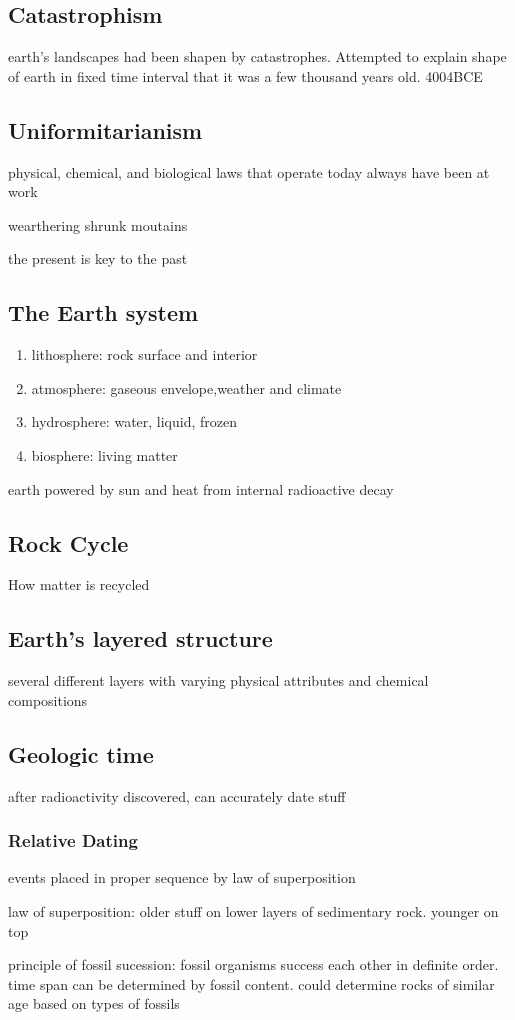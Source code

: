 \documentclass[11pt]{amsart}
\begin{document}
\subsection{Catastrophism}
\par earth's landscapes had been shapen by catastrophes. Attempted to explain
shape of earth in fixed time interval that it was a few thousand years old.
4004BCE
\subsection{Uniformitarianism}
\par physical, chemical, and biological laws that operate today always have
been at work
\par wearthering shrunk moutains

\par the present is key to the past
\subsection{The Earth system}
\begin{enumerate}
  \item lithosphere: rock surface and interior
  \item atmosphere: gaseous envelope,weather and climate
  \item hydrosphere: water, liquid, frozen
  \item biosphere: living matter
\end{enumerate}
\par earth powered by sun and heat from internal radioactive decay
\subsection{Rock Cycle}
\par How matter is recycled
\subsection{Earth's layered structure}
\item several different layers with varying physical attributes and chemical compositions
  \subsection{Geologic time}
  \par after radioactivity discovered, can accurately date stuff

  \subsubsection{Relative Dating}
  \par events placed in proper sequence by law of superposition
  \par law of superposition: older stuff on lower layers of sedimentary rock.
  younger on top
  \par principle of fossil sucession: fossil organisms success each other in
  definite order. time span can be determined by fossil content. could
  determine rocks of similar age based on types of fossils
\end{document}
